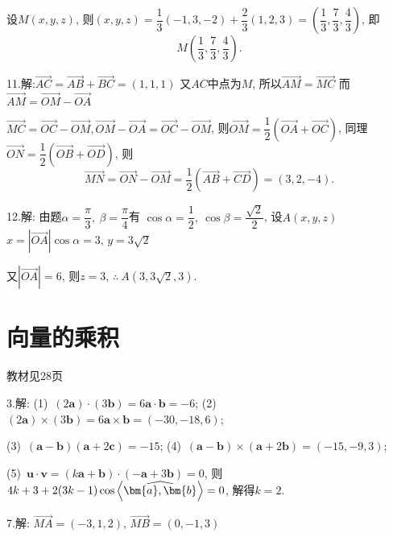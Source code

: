   设$M(x,y,z)$, 则$(x,y,z)=\dfrac{1}{3} (-1,3,-2) + \dfrac{2}{3} (1,2,3) = \left(\dfrac{1}{3},\dfrac{7}{3},\dfrac{4}{3} \right)$, 即
  $$M(\dfrac{1}{3},\dfrac{7}{3},\dfrac{4}{3}).$$

  11.解:$\overrightarrow {AC}  = \overrightarrow {AB}  + \overrightarrow {BC}  = (1,1,1)$
  又$AC$中点为$M$, 所以$\overrightarrow {AM}  = \overrightarrow {MC}$
  而$\overrightarrow {AM}  = \overrightarrow {OM}  - \overrightarrow {OA} $

  $\overrightarrow {MC}  = \overrightarrow {OC}  - \overrightarrow {OM} ,\overrightarrow {OM}  - \overrightarrow {OA}  = \overrightarrow {OC}  - \overrightarrow {OM}$,
  则$\overrightarrow {OM}  = \dfrac{1}{2}(\overrightarrow {OA}  + \overrightarrow {OC} )$,
  同理$\overrightarrow {ON}  = \dfrac{1}{2}(\overrightarrow {OB}  + \overrightarrow {OD} )$, 则
  $$\overrightarrow {MN}  = \overrightarrow {ON}  - \overrightarrow {OM}  = \frac{1}{2}(\overrightarrow {AB}  + \overrightarrow {CD} ) = (3,2, - 4).$$

  12.解: 由题$\alpha  = \dfrac{\pi }{3},~\beta  = \dfrac{\pi }{4}$有
  $\cos \alpha  = \dfrac{1}{2}, ~\cos \beta  = \dfrac{{\sqrt 2 }}{2}$,
  设$A(x,y,z)$
  $x=\left| {\overrightarrow {OA} } \right|\cos \alpha  = 3$,
  $y=3\sqrt 2$

  又$\left| {\overrightarrow {OA} } \right| = 6$, 则$z=3$,
  $\therefore~A(3,3\sqrt{2},3)$.

\section{向量的乘积}
\begin{flushright}
  \color{zhanqing!80}
   教材见28页
\end{flushright}

  3.解: (1)~$(2\bm{a} ) \cdot (3\bm{b} ) = 6 \bm{a} \cdot \bm{b}  =  - 6$; \qquad
  (2)~$\left( {2\bm{a} } \right) \times \left( {3\bm{b} } \right) = 6\bm{a}  \times \bm{b}  = ( - 30, - 18,6 )$;

  (3)~$\left( {\bm{a} } - {\bm{b} } \right) \left( {\bm{a} } + 2 {\bm{c} } \right) =  - 15$; \qquad \qquad
  (4)~$\left( {\bm{a} } - {\bm{b} } \right) \times \left( {\bm{a} } + 2 {\bm{b} } \right) = ( - 15, - 9,3)$;

  (5)~$\bm{u}  \cdot \bm{v}  = (k\bm{a}  + \bm{b} ) \cdot ( - \bm{a}  + 3\bm{b} ) = 0$, 则$\- 4k + 3 + 2(3k - 1) \cos\left\langle {\widehat {\bm{a},\bm{b}}} \right\rangle  = 0$, 解得$k=2$.

  7.解: $\overrightarrow {MA}  = ( - 3,1,2)$, $\overrightarrow {MB}  = (0, - 1,3)$

